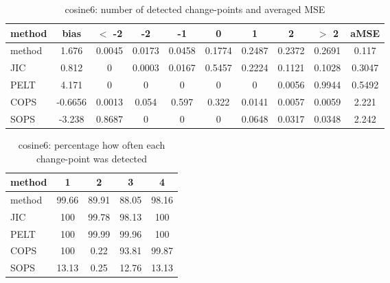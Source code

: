 \begin{table}[ht]
\centering
\begin{tabular}{l|c|ccccccc|c}
  \hline
method & bias & $<$ -2 & -2 & -1 & 0 & 1 & 2 & $>$ 2 & aMSE \\ 
  \hline
method & 1.676 & 0.0045 & 0.0173 & 0.0458 & 0.1774 & 0.2487 & 0.2372 & 0.2691 & 0.117 \\ 
  JIC & 0.812 &     0 & 0.0003 & 0.0167 & 0.5457 & 0.2224 & 0.1121 & 0.1028 & 0.3047 \\ 
  PELT & 4.171 &     0 &     0 &     0 &     0 &     0 & 0.0056 & 0.9944 & 0.5492 \\ 
  COPS & -0.6656 & 0.0013 & 0.054 & 0.597 & 0.322 & 0.0141 & 0.0057 & 0.0059 & 2.221 \\ 
  SOPS & -3.238 & 0.8687 &     0 &     0 &     0 & 0.0648 & 0.0317 & 0.0348 & 2.242 \\ 
   \hline
\end{tabular}
\caption{cosine6: number of detected change-points and averaged MSE} 
\label{tab:cosine6Njumps}
\end{table}
\begin{table}[ht]
\centering
\begin{tabular}{l|cccc}
  \hline
method & 1 & 2 & 3 & 4 \\ 
  \hline
method &  99.66 &  89.91 &  88.05 &  98.16 \\ 
  JIC &    100 &  99.78 &  98.13 &    100 \\ 
  PELT &    100 &  99.99 &  99.96 &    100 \\ 
  COPS &    100 &   0.22 &  93.81 &  99.87 \\ 
  SOPS &  13.13 &   0.25 &  12.76 &  13.13 \\ 
   \hline
\end{tabular}
\caption{cosine6: percentage how often each change-point was detected} 
\label{tab:cosine6Detections}
\end{table}
